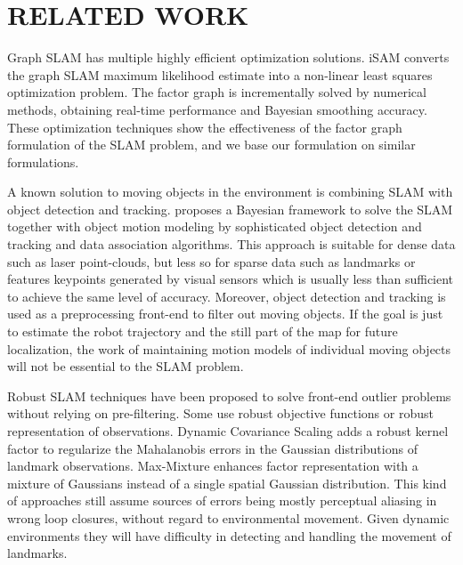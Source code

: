 \section{RELATED WORK}

Graph SLAM has multiple highly efficient optimization solutions.
iSAM \cite{isam} converts the graph SLAM maximum likelihood estimate into a
non-linear least squares optimization problem.  The factor graph is incrementally solved by numerical methods, obtaining real-time performance and Bayesian smoothing accuracy. These optimization techniques show the effectiveness of the factor graph formulation of the SLAM problem, and we base our formulation on similar formulations.


A known solution to moving objects in the environment is combining SLAM with
object detection and tracking. \cite{wang2003online} proposes a Bayesian
framework to solve the SLAM together with object motion modeling by
sophisticated object detection and tracking and data association algorithms.
This approach is suitable for dense data such as laser point-clouds, but less
so for sparse data such as landmarks or features keypoints generated by visual
sensors which is usually less than sufficient to achieve the same level of
accuracy.  Moreover, object detection and tracking is used as a preprocessing
front-end to filter out moving objects. If the goal is just to estimate the
robot trajectory and the still part of the map for future localization, the
work of maintaining motion models of individual moving objects will not be
essential to the SLAM problem. 

Robust SLAM techniques have been proposed to solve front-end outlier problems
without relying on pre-filtering. Some use robust objective functions or robust
representation of observations. Dynamic Covariance Scaling\cite{DCS} adds a
robust kernel factor to regularize the Mahalanobis errors in the Gaussian
distributions of landmark observations.  Max-Mixture\cite{mm} enhances factor
representation with a mixture of Gaussians instead of a single spatial Gaussian
distribution. This kind of approaches still assume sources of errors being
mostly perceptual aliasing in wrong loop closures, without regard to
environmental movement.  Given dynamic environments they will have difficulty
in detecting and handling the movement of landmarks.

